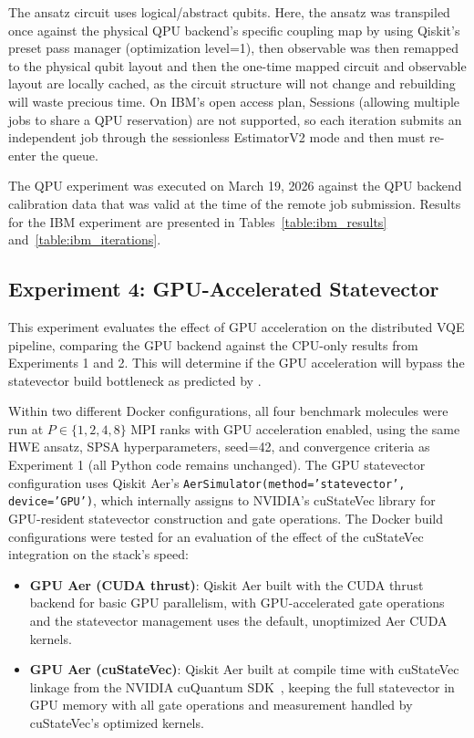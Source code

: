 The ansatz circuit uses logical/abstract qubits. Here, the ansatz was transpiled once against the physical QPU backend's specific coupling map by using Qiskit's preset pass 
manager (optimization level=1), then observable was then remapped to the physical qubit layout and then the one-time mapped circuit and observable layout are locally cached, 
as the circuit structure will not change and rebuilding will waste precious time. On IBM's 
open access plan, Sessions (allowing multiple jobs to share a QPU reservation) are not supported, so each iteration submits an independent job through the 
sessionless EstimatorV2 mode and then must re-enter the queue.    

The QPU experiment was executed on March 19, 2026 against the QPU backend calibration data that was valid at the time of the remote
job submission. Results for the IBM experiment are presented in Tables~\ref{table:ibm_results} and~\ref{table:ibm_iterations}.


\subsection{Experiment 4: GPU-Accelerated Statevector}
This experiment evaluates the effect of GPU acceleration on the distributed VQE pipeline, comparing the GPU 
backend against the CPU-only results from Experiments 1 and 2. This will determine if the GPU acceleration will bypass the statevector build bottleneck as predicted by \textcite{bayraktar2023cuquantum}. 

Within two different Docker configurations, all four benchmark molecules were run at $P \in \{1,2,4,8\}$ MPI ranks with GPU acceleration enabled, using the same HWE ansatz, SPSA hyperparameters, seed=42, and convergence criteria as Experiment 1 (all Python code remains unchanged). 
The GPU statevector configuration uses Qiskit Aer's \texttt{AerSimulator(method='statevector', device='GPU')}, which internally assigns to NVIDIA's cuStateVec library for GPU-resident statevector 
construction and gate operations. The Docker build configurations were tested for an evaluation of the effect of the cuStateVec integration on the stack's speed:
\begin{itemize}
    \item \textbf{GPU Aer (CUDA thrust)}: Qiskit Aer built with the CUDA thrust backend for basic GPU parallelism, with GPU-accelerated gate operations and the statevector management uses the default, unoptimized Aer CUDA kernels.
    \item \textbf{GPU Aer (cuStateVec)}: Qiskit Aer built at compile time with cuStateVec linkage from the NVIDIA cuQuantum SDK~\parencite{bayraktar2023cuquantum}, keeping the full statevector in GPU memory with all gate operations and measurement handled by cuStateVec's optimized kernels.
\end{itemize}

